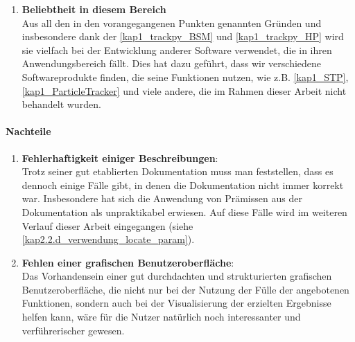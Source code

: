 \begin{enumerate}
    			\item \textbf{Beliebtheit in diesem Bereich}\\
    			Aus all den in den vorangegangenen Punkten genannten Gründen und insbesondere dank der \ref{kap1_trackpy_BSM} und \ref{kap1_trackpy_HP} wird sie vielfach bei der Entwicklung anderer Software verwendet, die in ihren Anwendungsbereich fällt. Dies hat dazu geführt, dass wir verschiedene Softwareprodukte finden, die seine Funktionen nutzen, wie z.B. \ref{kap1_STP}, \ref{kap1_ParticleTracker} und viele andere, die im Rahmen dieser Arbeit nicht behandelt wurden.
    			
		\end{enumerate}
		
	\paragraph{Nachteile}
		\begin{enumerate}
				\item \textbf{Fehlerhaftigkeit einiger Beschreibungen}:\\				
				Trotz seiner gut etablierten Dokumentation muss man feststellen, dass es dennoch einige Fälle gibt, in denen die Dokumentation nicht immer korrekt war. Insbesondere hat sich die Anwendung von Prämissen aus der Dokumentation als unpraktikabel erwiesen. Auf diese Fälle wird im weiteren Verlauf dieser Arbeit eingegangen (siehe \ref{kap2.2.d_verwendung_locate_param}).   
				    			
    			\item \textbf{Fehlen einer grafischen Benutzeroberfläche}:\\
    			Das Vorhandensein einer gut durchdachten und strukturierten grafischen Benutzeroberfläche, die nicht nur bei der Nutzung der Fülle der angebotenen Funktionen, sondern auch bei der Visualisierung der erzielten Ergebnisse helfen kann, wäre für die Nutzer natürlich noch interessanter und verführerischer gewesen.
		\end{enumerate}
		
